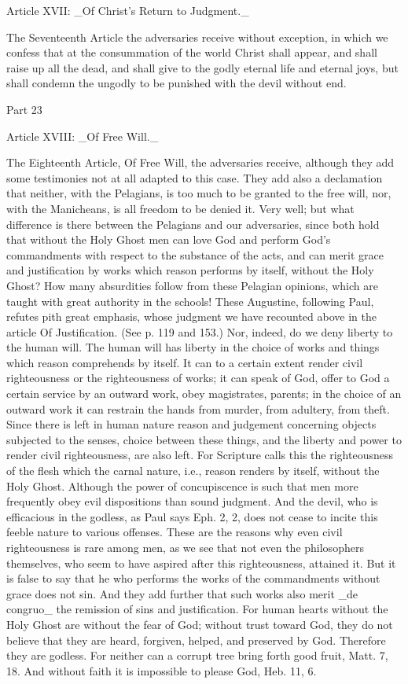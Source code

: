 Article XVII: _Of Christ's Return to Judgment._

The Seventeenth Article the adversaries receive without exception, in
which we confess that at the consummation of the world Christ shall
appear, and shall raise up all the dead, and shall give to the godly
eternal life and eternal joys, but shall condemn the ungodly to be
punished with the devil without end.




Part 23


Article XVIII: _Of Free Will._

The Eighteenth Article, Of Free Will, the adversaries receive,
although they add some testimonies not at all adapted to this case.
They add also a declamation that neither, with the Pelagians, is too
much to be granted to the free will, nor, with the Manicheans, is all
freedom to be denied it.  Very well; but what difference is there
between the Pelagians and our adversaries, since both hold that
without the Holy Ghost men can love God and perform God's
commandments with respect to the substance of the acts, and can merit
grace and justification by works which reason performs by itself,
without the Holy Ghost?  How many absurdities follow from these
Pelagian opinions, which are taught with great authority in the
schools!  These Augustine, following Paul, refutes pith great
emphasis, whose judgment we have recounted above in the article Of
Justification.  (See p. 119 and 153.) Nor, indeed, do we deny liberty
to the human will.  The human will has liberty in the choice of works
and things which reason comprehends by itself.  It can to a certain
extent render civil righteousness or the righteousness of works; it
can speak of God, offer to God a certain service by an outward work,
obey magistrates, parents; in the choice of an outward work it can
restrain the hands from murder, from adultery, from theft.  Since
there is left in human nature reason and judgement concerning objects
subjected to the senses, choice between these things, and the liberty
and power to render civil righteousness, are also left.  For
Scripture calls this the righteousness of the flesh which the carnal
nature, i.e., reason renders by itself, without the Holy Ghost.
Although the power of concupiscence is such that men more frequently
obey evil dispositions than sound judgment.  And the devil, who is
efficacious in the godless, as Paul says Eph. 2, 2, does not cease to
incite this feeble nature to various offenses.  These are the reasons
why even civil righteousness is rare among men, as we see that not
even the philosophers themselves, who seem to have aspired after this
righteousness, attained it.  But it is false to say that he who
performs the works of the commandments without grace does not sin.
And they add further that such works also merit _de congruo_ the
remission of sins and justification.  For human hearts without the
Holy Ghost are without the fear of God; without trust toward God,
they do not believe that they are heard, forgiven, helped, and
preserved by God.  Therefore they are godless.  For neither can a
corrupt tree bring forth good fruit, Matt. 7, 18. And without faith
it is impossible to please God, Heb. 11, 6.

